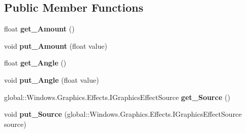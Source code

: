 \subsection*{Public Member Functions}
\begin{DoxyCompactItemize}
\item 
\mbox{\label{interface_microsoft_1_1_graphics_1_1_canvas_1_1_effects_1_1_i_emboss_effect_a1335600c5f13152a8846556dd82a3c6a}} 
float {\bfseries get\+\_\+\+Amount} ()
\item 
\mbox{\label{interface_microsoft_1_1_graphics_1_1_canvas_1_1_effects_1_1_i_emboss_effect_af365bd3a8f1fa96d24219c0d6150c0af}} 
void {\bfseries put\+\_\+\+Amount} (float value)
\item 
\mbox{\label{interface_microsoft_1_1_graphics_1_1_canvas_1_1_effects_1_1_i_emboss_effect_a40c6db54f51aa5bc19649ee456d1afd4}} 
float {\bfseries get\+\_\+\+Angle} ()
\item 
\mbox{\label{interface_microsoft_1_1_graphics_1_1_canvas_1_1_effects_1_1_i_emboss_effect_aa128a0cacc6e71db4b51016111649d41}} 
void {\bfseries put\+\_\+\+Angle} (float value)
\item 
\mbox{\label{interface_microsoft_1_1_graphics_1_1_canvas_1_1_effects_1_1_i_emboss_effect_adf3fd330425fb1ca6fcf9bf2b14f108f}} 
global\+::\+Windows.\+Graphics.\+Effects.\+I\+Graphics\+Effect\+Source {\bfseries get\+\_\+\+Source} ()
\item 
\mbox{\label{interface_microsoft_1_1_graphics_1_1_canvas_1_1_effects_1_1_i_emboss_effect_a0beba0a5351e5945a4d86ac4e850ffba}} 
void {\bfseries put\+\_\+\+Source} (global\+::\+Windows.\+Graphics.\+Effects.\+I\+Graphics\+Effect\+Source source)
\item 
\mbox{\label{interface_microsoft_1_1_graphics_1_1_canvas_1_1_effects_1_1_i_emboss_effect_a1335600c5f13152a8846556dd82a3c6a}} 

\end{DoxyCompactItemize}

